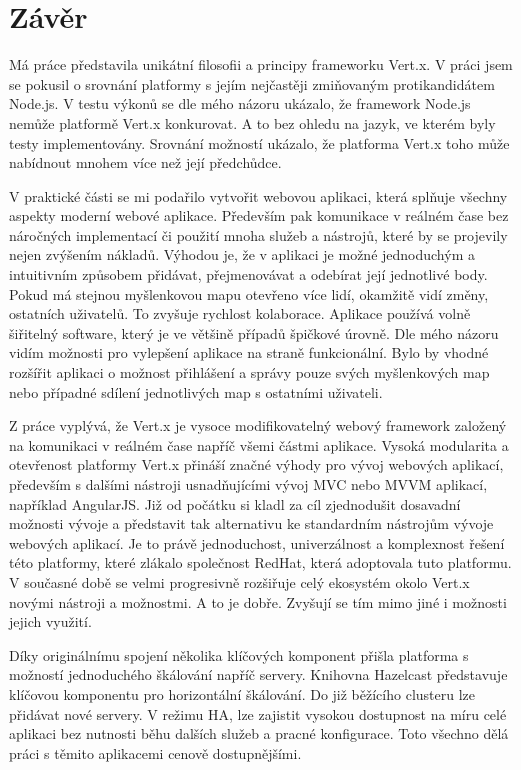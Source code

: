
\chapter[Závěr]{Závěr}

Má práce představila unikátní filosofii a principy frameworku Vert.x. V práci jsem se pokusil o srovnání platformy s jejím nejčastěji zmiňovaným protikandidátem Node.js. V testu výkonů se dle mého názoru ukázalo, že framework Node.js nemůže platformě Vert.x konkurovat. A to bez ohledu na jazyk, ve kterém byly testy implementovány. Srovnání možností ukázalo, že platforma Vert.x toho může nabídnout mnohem více než její předchůdce. 

V praktické části se  mi podařilo vytvořit webovou aplikaci, která splňuje všechny aspekty moderní webové aplikace. Především pak komunikace v reálném čase bez náročných implementací či použití mnoha služeb a nástrojů, které by se projevily nejen zvýšením nákladů. Výhodou je, že v aplikaci je možné jednoduchým a intuitivním způsobem přidávat, přejmenovávat a odebírat její jednotlivé body. Pokud má stejnou myšlenkovou mapu otevřeno více lidí, okamžitě vidí změny, ostatních uživatelů. To zvyšuje rychlost kolaborace. Aplikace používá volně šiřitelný software, který je ve většině případů špičkové úrovně. %
Dle mého názoru vidím možnosti pro vylepšení aplikace na straně funkcionální. Bylo by vhodné rozšířit aplikaci o možnost přihlášení a správy pouze svých myšlenkových map nebo případné sdílení jednotlivých map s ostatními uživateli.

Z práce vyplývá, že Vert.x je vysoce modifikovatelný webový framework založený na komunikaci v reálném čase napříč všemi částmi aplikace. Vysoká modularita a otevřenost platformy Vert.x přináší značné výhody pro vývoj webových aplikací, především s dalšími nástroji usnadňujícími vývoj MVC nebo MVVM aplikací, například AngularJS. Již od počátku si kladl za cíl zjednodušit dosavadní možnosti vývoje a představit tak alternativu ke standardním nástrojům vývoje webových aplikací. Je to právě jednoduchost, univerzálnost a komplexnost řešení této platformy, které zlákalo společnost RedHat, která adoptovala tuto platformu. V současné době se velmi progresivně rozšiřuje celý ekosystém okolo Vert.x novými nástroji a možnostmi. A to je dobře. Zvyšují se tím mimo jiné i možnosti jejich využití.

Díky originálnímu spojení několika klíčových komponent přišla platforma s možností jednoduchého škálování napříč servery. Knihovna Hazelcast představuje klíčovou komponentu pro horizontální škálování. Do již běžícího clusteru lze přidávat nové servery. V režimu HA, lze zajistit vysokou dostupnost na míru celé aplikaci bez nutnosti běhu dalších služeb a pracné konfigurace. Toto všechno dělá práci s těmito aplikacemi cenově dostupnějšími.

